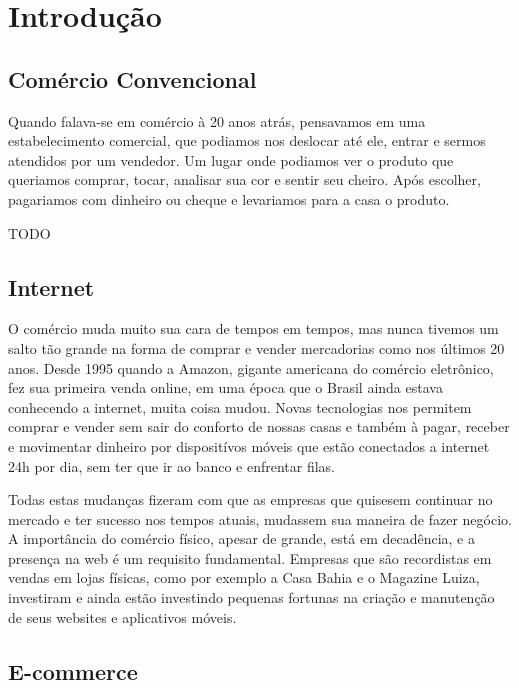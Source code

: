 \chapter{Introdução}

\section{Comércio Convencional}

Quando falava-se em comércio à 20 anos atrás, pensavamos em uma estabelecimento comercial, que podiamos nos deslocar até ele, entrar e sermos atendidos por um vendedor. Um lugar onde podiamos ver o produto que queriamos comprar, tocar, analisar sua cor e sentir seu cheiro. Após escolher, pagariamos com dinheiro ou cheque e levariamos para a casa o produto.

TODO

\section{Internet}

O comércio muda muito sua cara de tempos em tempos, mas nunca tivemos um salto tão grande na forma de comprar e vender mercadorias como nos últimos 20 anos. Desde 1995 quando a Amazon, gigante americana do comércio eletrônico, fez sua primeira venda online, em uma época que o Brasil ainda estava conhecendo a internet, muita coisa mudou. Novas tecnologias nos permitem comprar e vender sem sair do conforto de nossas casas e também à pagar, receber e movimentar dinheiro por dispositívos móveis que estão conectados a internet 24h por dia, sem ter que ir ao banco e enfrentar filas.

Todas estas mudanças fizeram com que as empresas que quisesem continuar no mercado e ter sucesso nos tempos atuais, mudassem sua maneira de fazer negócio. A importância do comércio físico, apesar de grande, está em decadência, e a presença na web é um requisito fundamental. Empresas que são recordistas em vendas em lojas físicas, como por exemplo a Casa Bahia e o Magazine Luiza, investiram e ainda estão investindo pequenas fortunas na criação e manutenção de seus websites e aplicativos móveis.

\section{E-commerce}

